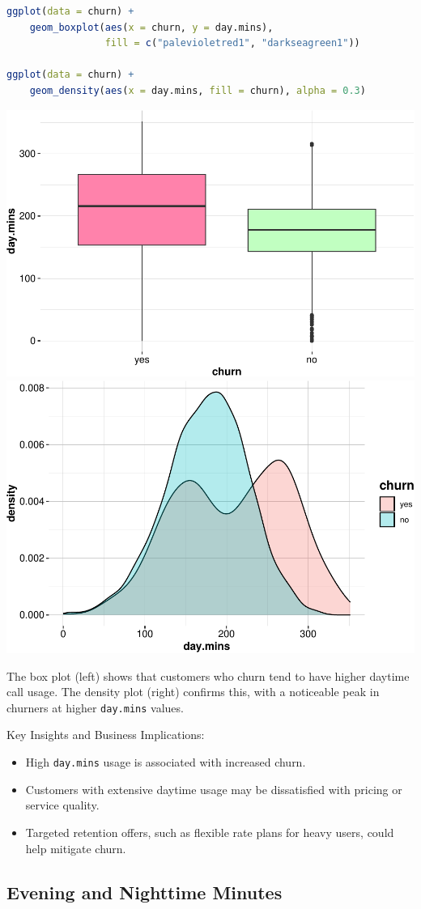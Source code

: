 \documentclass[
]{book}
\newcommand{\passthrough}[1]{#1}
\providecommand{\tightlist}{%
  \setlength{\itemsep}{0pt}\setlength{\parskip}{0pt}}
\theoremstyle{definition}
\theoremstyle{definition}
\theoremstyle{definition}
\theoremstyle{definition}
\theoremstyle{remark}
\begin{document}
\begin{lstlisting}[language=R]
ggplot(data = churn) +
    geom_boxplot(aes(x = churn, y = day.mins), 
                 fill = c("palevioletred1", "darkseagreen1"))

ggplot(data = churn) +
    geom_density(aes(x = day.mins, fill = churn), alpha = 0.3)
\end{lstlisting}

\includegraphics[width=0.5\linewidth]{EDA_files/figure-latex/unnamed-chunk-11-1} \includegraphics[width=0.5\linewidth]{EDA_files/figure-latex/unnamed-chunk-11-2}

The box plot (left) shows that customers who churn tend to have higher daytime call usage. The density plot (right) confirms this, with a noticeable peak in churners at higher \passthrough{\lstinline!day.mins!} values.

Key Insights and Business Implications:

\begin{itemize}
\tightlist
\item
  High \passthrough{\lstinline!day.mins!} usage is associated with increased churn.\\
\item
  Customers with extensive daytime usage may be dissatisfied with pricing or service quality.\\
\item
  Targeted retention offers, such as flexible rate plans for heavy users, could help mitigate churn.
\end{itemize}

\subsection*{Evening and Nighttime Minutes}\label{evening-and-nighttime-minutes}
\end{document}
